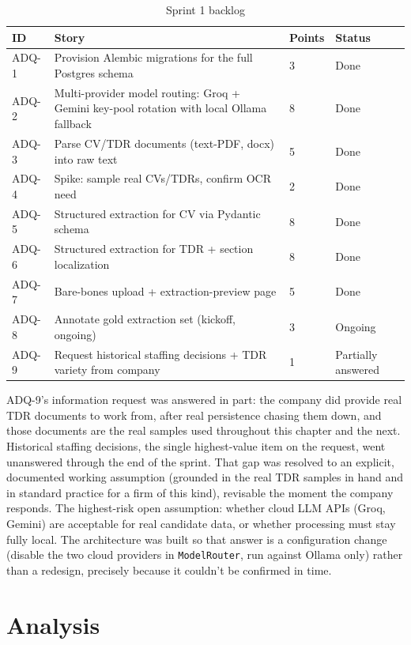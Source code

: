 \begin{table}[H]
  \centering
  \caption{Sprint 1 backlog}
  \label{tab:sprint1-backlog}
  \begin{tabular}{@{}p{1.3cm}p{11.6cm}p{1.3cm}p{2.7cm}@{}}
    \toprule
    ID & Story & Points & Status \\
    \midrule
    ADQ-1 & Provision Alembic migrations for the full Postgres schema & 3 & Done \\
    ADQ-2 & Multi-provider model routing: Groq + Gemini key-pool rotation with local Ollama fallback & 8 & Done \\
    ADQ-3 & Parse CV/TDR documents (text-PDF, docx) into raw text & 5 & Done \\
    ADQ-4 & Spike: sample real CVs/TDRs, confirm OCR need & 2 & Done \\
    ADQ-5 & Structured extraction for CV via Pydantic schema & 8 & Done \\
    ADQ-6 & Structured extraction for TDR + section localization & 8 & Done \\
    ADQ-7 & Bare-bones upload + extraction-preview page & 5 & Done \\
    ADQ-8 & Annotate gold extraction set (kickoff, ongoing) & 3 & Ongoing \\
    ADQ-9 & Request historical staffing decisions + TDR variety from company & 1 & Partially answered \\
    \bottomrule
  \end{tabular}
\end{table}

ADQ-9's information request was answered in part: the company did provide
real TDR documents to work from, after real persistence chasing them down,
and those documents are the real samples used throughout this chapter and
the next. Historical staffing decisions, the single highest-value item on
the request, went unanswered through the end of the sprint. That gap was
resolved to an explicit, documented working assumption (grounded in the
real TDR samples in hand and in standard practice for a firm of this
kind), revisable the moment the company responds. The highest-risk open
assumption: whether cloud LLM APIs (Groq, Gemini) are acceptable for real
candidate data, or whether processing must stay fully local. The
architecture was built so that answer is a configuration change (disable
the two cloud providers in \texttt{ModelRouter}, run against Ollama only)
rather than a redesign, precisely because it couldn't be confirmed in time.

\section{Analysis}

